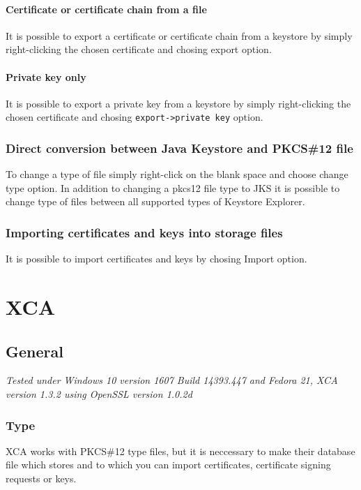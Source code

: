 \documentclass[10pt, a4paper]{report}
\begin{document}
    \subsubsection{Certificate or certificate chain from a file}
It is possible to export a certificate or certificate chain from a keystore by simply right-clicking the chosen certificate and chosing export option.

    \subsubsection{Private key only}
It is possible to export a private key from a keystore by simply right-clicking the chosen certificate and chosing \verb+export->private key+ option.

  \subsection{Direct conversion between Java Keystore and PKCS\#12 file}
To change a type of file simply right-click on the blank space and choose change type option. In addition to changing a pkcs12 file type to JKS it is possible to change type of files between all supported types of Keystore Explorer.
  
  \subsection{Importing certificates and keys into storage files}
It is possible to import certificates and keys by chosing Import option.

\chapter{XCA}

\section{General}

\textit{Tested under Windows 10 version 1607 Build 14393.447 and Fedora 21, XCA version 1.3.2 using OpenSSL version 1.0.2d}

  \subsection{Type}
XCA works with PKCS\#12 type files, but it is neccessary to make their database file which stores and to which you can import certificates, certificate signing requests or keys.
\end{document}

